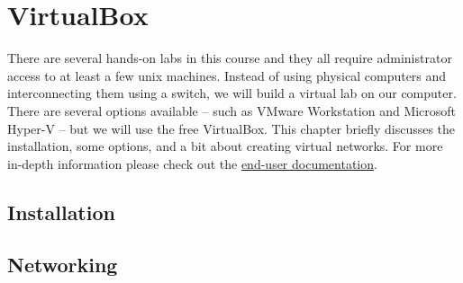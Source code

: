 \chapter{VirtualBox}
\label{chap:virtualbox}

There are several hands-on labs in this course and they all require administrator access to at least a few unix machines.
Instead of using physical computers and interconnecting them using a switch, we will build a virtual lab on our computer.
There are several options available -- such as VMware Workstation and Microsoft Hyper-V -- but we will use the free VirtualBox.
This chapter briefly discusses the installation, some options, and a bit about creating virtual networks.
For more in-depth information please check out the \href{https://www.virtualbox.org/wiki/End-user_documentation}{end-user documentation}.

\section{Installation}

\section{Networking}